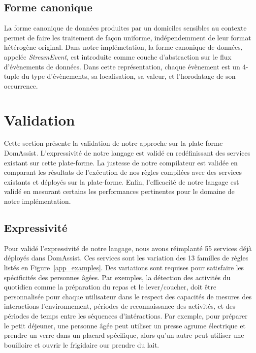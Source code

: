 \subsection{Forme canonique}
La forme canonique de données produites par un domiciles sensibles au contexte permet de faire les traitement de façon uniforme, indépendemment de leur format hétérogène original. Dans notre implémetation, la forme canonique de données, appelée {\em StreamEvent}, est introduite comme couche d'abstraction sur le flux d'évènements de données. Dans cette représentation, chaque évènement est un 4-tuple du type d'évènements, sa localisation, sa valeur, et l'horodatage de son occurrence.

\section{Validation}\label{sec:validation}

Cette section présente la validation de notre approche sur la plate-forme DomAssist. L'expressivité de notre langage est validé en redéfinissant des services existant sur cette plate-forme. La justesse de notre compilateur est validée en comparant les résultats de l'exécution de nos règles compilées avec des services existants et déployés sur la plate-forme. Enfin, l'efficacité de notre langage est validé en mesurant certains les performances pertinentes pour le domaine de notre implémentation.



\subsection{Expressivité}\label{validation:expressiveness}
Pour validé l'expressivité de notre langage, nous avons réimplanté 55 services déjà déployés dans DomAssist. Ces services sont les variation des 13 familles de règles listés en Figure~\ref{app_examples}. Des variations sont requises pour satisfaire les spécificités des personnes âgées. Par exemples, la détection des activités du quotidien comme la préparation du repas et le lever/coucher, doit être personnalisée pour chaque utilisateur dans le respect des capacités de mesures des interactions l'environnement, périodes de reconnaissance des activités, et des périodes de temps entre les séquences d'intéractions. Par exemple, pour préparer le petit déjeuner, une personne âgée peut utiliser un presse agrume électrique et prendre un verre dans un placard spécifique, alors qu'un autre peut utiliser une bouilloire et ouvrir le frigidaire our prendre du lait.

